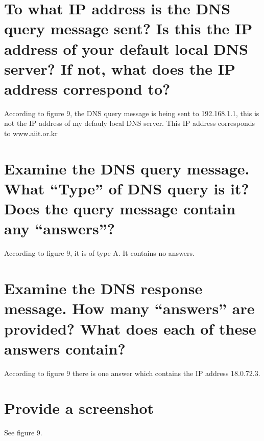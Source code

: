 \documentclass{article}
\begin{document}
\section{To what IP address is the DNS query message sent? Is this the IP address of your
default local DNS server? If not, what does the IP address correspond to?}
According to figure 9, the DNS query message is being sent to 192.168.1.1, this is not the IP address of my defauly local DNS server.  This IP address corresponds to www.aiit.or.kr

\section{Examine the DNS query message. What “Type” of DNS query is it? Does the
query message contain any “answers”?}
According to figure 9, it is of type A.  It contains no answers.\\

\section{Examine the DNS response message. How many “answers” are provided? What
does each of these answers contain?}
According to figure 9 there is one answer which contains the IP address 18.0.72.3.\\

\section{Provide a screenshot}
See figure 9.\\
\end{document}

